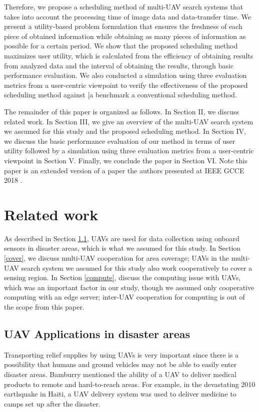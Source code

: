\documentclass{ieeeaccess}
\begin{document}
Therefore, we propose a scheduling method of multi-UAV search systems that takes into account the processing time of image data and data-transfer time. We present a utility-based problem formulation that ensures the freshness of each piece of obtained information while obtaining as many pieces of information as possible for a certain period. We show that the proposed scheduling method maximizes user utility, which is calculated from the efficiency of obtaining results from analyzed data and the interval of obtaining the results, through basic performance evaluation. We also conducted a simulation using three evaluation metrics from a user-centric viewpoint to verify the effectiveness of the proposed scheduling method against [a benchmark a conventional scheduling method.

The remainder of this paper is organized as follows. In Section II, we discuss related work. In Section III, we give an overview of the multi-UAV search system we assumed for this study and the proposed scheduling method. In Section IV, we discuss the basic performance evaluation of our method in terms of user utility followed by a simulation using three evaluation metrics from a user-centric viewpoint in Section V. Finally, we conclude the paper in Section VI. Note this paper is an extended version of a paper the authors presented at IEEE GCCE 2018 \cite{GCCE2018}.

\section{Related work}
As described in Section \ref{app}, UAVs are used for data collection using onboard sensors in disaster areas, which is what we assumed for this study. In Section \ref{cover}, we discuss multi-UAV cooperation for area coverage; UAVs in the multi-UAV search system we assumed for this study also work cooperatively to cover a sensing region. In Section \ref{compute}, discuss the computing issue with UAVs, which was an important factor in our study, though we assumed only cooperative computing with an edge server; inter-UAV cooperation for computing is out of the scope from this paper.

\subsection{UAV Applications in disaster areas}\label{app}
Transporting relief supplies by using UAVs is very important since there is a possibility that humans and ground vehicles may not be able to easily enter disaster areas.
Bamburry mentioned the ability of a UAV to deliver medical products to remote and hard-to-reach areas\cite{Bamburry2015}.
For example, in the devastating 2010 earthquake in Haiti, a UAV delivery system was used to deliver medicine to camps set up after the disaster\cite{May2015}.
\end{document}
